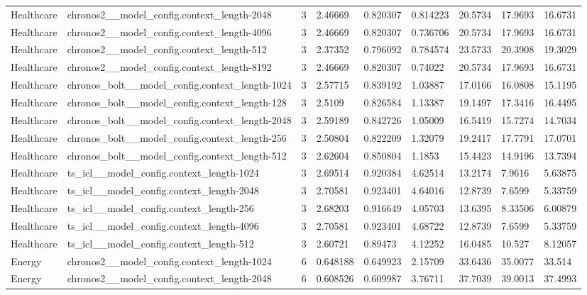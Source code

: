 \begin{tabular}{lllllllll}
Healthcare & chronos2\_\_model\_config.context\_length-2048 & 3 & 2.46669 & 0.820307 & 0.814223 & 20.5734 & 17.9693 & 16.6731 \\
Healthcare & chronos2\_\_model\_config.context\_length-4096 & 3 & 2.46669 & 0.820307 & 0.736706 & 20.5734 & 17.9693 & 16.6731 \\
Healthcare & chronos2\_\_model\_config.context\_length-512 & 3 & 2.37352 & 0.796092 & 0.784574 & 23.5733 & 20.3908 & 19.3029 \\
Healthcare & chronos2\_\_model\_config.context\_length-8192 & 3 & 2.46669 & 0.820307 & 0.74022 & 20.5734 & 17.9693 & 16.6731 \\
Healthcare & chronos\_bolt\_\_model\_config.context\_length-1024 & 3 & 2.57715 & 0.839192 & 1.03887 & 17.0166 & 16.0808 & 15.1195 \\
Healthcare & chronos\_bolt\_\_model\_config.context\_length-128 & 3 & 2.5109 & 0.826584 & 1.13387 & 19.1497 & 17.3416 & 16.4495 \\
Healthcare & chronos\_bolt\_\_model\_config.context\_length-2048 & 3 & 2.59189 & 0.842726 & 1.05009 & 16.5419 & 15.7274 & 14.7034 \\
Healthcare & chronos\_bolt\_\_model\_config.context\_length-256 & 3 & 2.50804 & 0.822209 & 1.32079 & 19.2417 & 17.7791 & 17.0701 \\
Healthcare & chronos\_bolt\_\_model\_config.context\_length-512 & 3 & 2.62604 & 0.850804 & 1.1853 & 15.4423 & 14.9196 & 13.7394 \\
Healthcare & ts\_icl\_\_model\_config.context\_length-1024 & 3 & 2.69514 & 0.920384 & 4.62514 & 13.2174 & 7.9616 & 5.63875 \\
Healthcare & ts\_icl\_\_model\_config.context\_length-2048 & 3 & 2.70581 & 0.923401 & 4.64016 & 12.8739 & 7.6599 & 5.33759 \\
Healthcare & ts\_icl\_\_model\_config.context\_length-256 & 3 & 2.68203 & 0.916649 & 4.05703 & 13.6395 & 8.33506 & 6.00879 \\
Healthcare & ts\_icl\_\_model\_config.context\_length-4096 & 3 & 2.70581 & 0.923401 & 4.68722 & 12.8739 & 7.6599 & 5.33759 \\
Healthcare & ts\_icl\_\_model\_config.context\_length-512 & 3 & 2.60721 & 0.89473 & 4.12252 & 16.0485 & 10.527 & 8.12057 \\
Energy & chronos2\_\_model\_config.context\_length-1024 & 6 & 0.648188 & 0.649923 & 2.15709 & 33.6436 & 35.0077 & 33.514 \\
Energy & chronos2\_\_model\_config.context\_length-2048 & 6 & 0.608526 & 0.609987 & 3.76711 & 37.7039 & 39.0013 & 37.4993 \\

\end{tabular}
